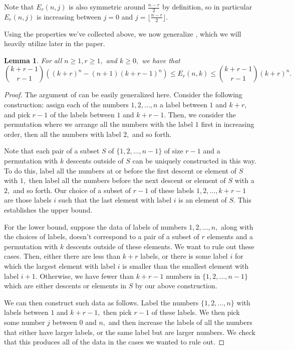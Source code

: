 \documentclass{article}
\newtheorem{lemma}[thm]{Lemma}
\theoremstyle{definition}
\theoremstyle{remark}
\begin{document}
\par Note that $E_r(n, j)$ is also symmetric around $\frac{n-r}{2}$ by definition, so in particular $E_r(n, j)$ is increasing between $j = 0$ and $j = \lfloor \frac{n-r}{2} \rfloor.$
\par Using the properties we've collected above, we now generalize \cite[Lemma C.1]{ls25}, which we will heavily utilize later in the paper.
\begin{lemma}\label{lem: Eulerian asymptotic}
For all $n \geq 1, r \geq 1,$ and $k \geq 0,$ we have that $$\binom{k + r - 1}{r-1} \left((k + r)^n - (n+1)(k + r - 1)^n\right) \leq E_r(n, k) \leq \binom{k+r-1}{r-1} (k+r)^n.$$
\end{lemma}
\begin{proof}
The argument of \cite[Lemma C.1]{ls25} can be easily generalized here. Consider the following construction: assign each of the numbers $1, 2, \ldots, n$ a label between $1$ and $k + r,$ and pick $r-1$ of the labels between $1$ and $k + r-1.$ Then, we consider the permutation where we arrange all the numbers with the label $1$ first in increasing order, then all the numbers with label $2,$ and so forth.
\par Note that each pair of a subset $S$ of $\{1, 2, \ldots, n-1\}$ of size $r-1$ and a permutation with $k$ descents outside of $S$ can be uniquely constructed in this way. To do this, label all the numbers at or before the first descent or element of $S$ with $1,$ then label all the numbers before the next descent or element of $S$ with a $2,$ and so forth. Our choice of a subset of $r-1$ of these labels $1, 2, \ldots, k+r-1$ are those labels $i$ such that the last element with label $i$ is an element of $S.$ This establishes the upper bound.
\par For the lower bound, suppose the data of labels of numbers $1, 2, \ldots, n,$ along with the choices of labels, doesn't correspond to a pair of a subset of $r$ elements and a permutation with $k$ descents outside of these elements. We want to rule out these cases. Then, either there are less than $k + r$ labels, or there is some label $i$ for which the largest element with label $i$ is smaller than the smallest element with label $i + 1.$ Otherwise, we have fewer than $k + r - 1$ numbers in $\{1, 2, \ldots, n-1\}$ which are either descents or elements in $S$ by our above construction. 
\par We can then construct such data as follows. Label the numbers $\{1, 2, \ldots, n\}$ with labels between $1$ and $k + r - 1,$ then pick $r-1$ of these labels. We then pick some number $j$ between $0$ and $n,$ and then increase the labels of all the numbers that either have larger labels, or the same label but are larger numbers. We check that this produces all of the data in the cases we wanted to rule out. 

\end{proof}
\end{document}
